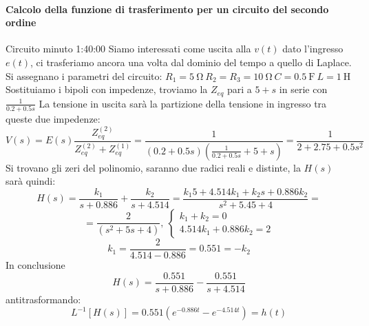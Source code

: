 \newpage
\paragraph{Calcolo della funzione di trasferimento per un circuito del secondo ordine}
Circuito minuto 1:40:00
Siamo interessati come uscita alla $v(t)$ dato l'ingresso $e(t)$, ci trasferiamo ancora una volta dal 
dominio del tempo a quello di Laplace.
Si assegnano i parametri del circuito:
$R_1 = \SI{5}{\ohm}\ R_2=R_3=\SI{10}{\ohm}\ C =\SI{0.5}{\farad}\ L=\SI{1}{\henry} $
Sostituiamo i bipoli con impedenze, troviamo la $Z_{eq}$ pari a $5 + s$ in serie con $\frac{1}{0.2+0.5s}$
La tensione in uscita sarà la partizione della tensione in ingresso tra queste due impedenze:
$$
V(s) = E(s)\frac{Z_{eq}^{(2)}}{Z_{eq}^{(2)}+Z_{eq}^{(1)}} = \frac{1}{(0.2+0.5 s)(\frac{1}{0.2+0.5 s}+5+s)} = \frac{1}{2+2.75+0.5s^2}
$$
Si trovano gli zeri del polinomio, saranno due radici reali e distinte,
la $H(s)$ sarà quindi:
$$
H(s) = \frac{k_1}{s+0.886} + \frac{k_2}{s+4.514} = \frac{k_1 5 +4.514 k_1 + k_2 s + 0.886 k_2 }{s^2+5.45+4} =
$$
$$
= \frac{2}{(s^2+5s+4)},\ 
\begin{cases}k_1+k_2 = 0\\
4.514k_1 + 0.886k_2 = 2
\end{cases}
$$
$$
k_1 = \frac{2}{4.514-0.886} = 0.551 = -k_2
$$
In conclusione 
$$
H(s) = \frac{0.551}{s+0.886} - \frac{0.551}{s+4.514}
$$
antitrasformando:
$$
L^{-1}[H(s)] = 0.551\left(e^{-0.886 t}-e^{-4.514 t}\right) = h(t)
$$
